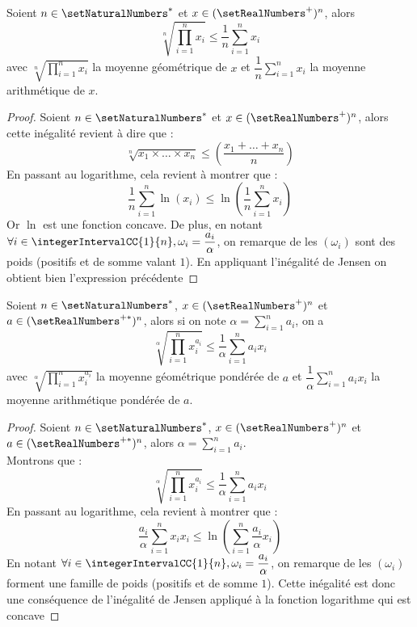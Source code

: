 \begin{theorem}
Soient $n \in \setNaturalNumbers^*$ et $x \in (\setRealNumbers^{+})^{n}$, alors
\[
\sqrt[n]{\displaystyle\prod\limits_{i=1}^{n}{x_i}} \le \dfrac{1}{n} \displaystyle\sum\limits_{i = 1}^{n} x_i
\]
avec $\sqrt[n]{\displaystyle\prod\limits_{i=1}^{n}{x_i}}$ la moyenne géométrique de $x$ et $\dfrac{1}{n} \displaystyle\sum\limits_{i = 1}^{n} x_i$ la moyenne arithmétique de $x$.
\end{theorem}

\begin{proof}
Soient $n \in \setNaturalNumbers^*$ et $x \in (\setRealNumbers^{+})^{n}$, alors cette inégalité revient à dire que :
\[
\sqrt[n]{x_1 \times \dots \times x_n} \le \left(\dfrac{x_1 + \dots + x_n}{n}\right)
\]
En passant au logarithme, cela revient à montrer que :
\[
\dfrac{1}{n}\displaystyle\sum\limits_{i = 1}^{n} \ln(x_i) \le \ln\left(\dfrac{1}{n}\displaystyle\sum\limits_{i = 1}^{n} x_i\right)
\]
Or $\ln$ est une fonction concave. De plus, en notant $\forall i \in \integerIntervalCC{1}{n}, \omega_i = \dfrac{a_i}{\alpha}$, on remarque de les $(\omega_i)$ sont des poids (positifs et de somme valant $1$). En appliquant l'inégalité de Jensen on obtient bien l'expression précédente
\end{proof}

\begin{lemma}
Soient $n \in \setNaturalNumbers^*$, $x \in (\setRealNumbers^{+})^{n}$ et $a \in (\setRealNumbers^{+*})^{n}$, alors si on note $\alpha = \displaystyle\sum\limits_{i = 1}^{n} a_i$, on a 
\[
\sqrt[\alpha]{\displaystyle\prod\limits_{i=1}^{n}{x_{i}^{a_i}}} \le \dfrac{1}{\alpha} \displaystyle\sum\limits_{i = 1}^{n} a_i x_i
\]
avec $\sqrt[\alpha]{\displaystyle\prod\limits_{i=1}^{n}{x_{i}^{a_i}}}$ la moyenne géométrique pondérée de $a$ et $\dfrac{1}{\alpha} \displaystyle\sum\limits_{i = 1}^{n} a_i x_i$ la moyenne arithmétique pondérée de $a$.
\end{lemma}

\begin{proof}
Soient $n \in \setNaturalNumbers^*$, $x \in (\setRealNumbers^{+})^{n}$ et $a \in (\setRealNumbers^{+*})^{n}$, alors $\alpha = \displaystyle\sum\limits_{i = 1}^{n} a_i$.\\
Montrons que :  
\[
\sqrt[\alpha]{\displaystyle\prod\limits_{i=1}^{n}{x_{i}^{a_i}}} \le \dfrac{1}{\alpha} \displaystyle\sum\limits_{i = 1}^{n} a_i x_i
\]
En passant au logarithme, cela revient à montrer que :
\[
\dfrac{a_i}{\alpha}\displaystyle\sum\limits_{i = 1}^{n} x_i x_i \le \ln\left(  \displaystyle\sum\limits_{i = 1}^{n} \dfrac{a_i}{\alpha} x_i\right)
\]
En notant $\forall i \in \integerIntervalCC{1}{n}, \omega_i = \dfrac{a_i}{\alpha}$, on remarque de les $(\omega_i)$ forment une famille de poids (positifs et de somme $1$). Cette inégalité est donc une conséquence de l'inégalité de Jensen appliqué à la fonction logarithme qui est concave
\end{proof}